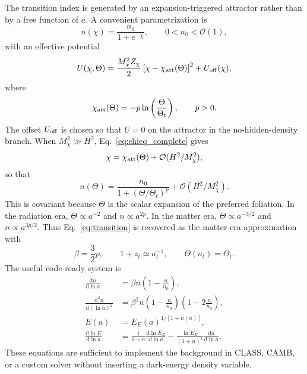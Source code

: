 \documentclass[aps,prd,reprint,nofootinbib,superscriptaddress,longbibliography]{revtex4-2}
\newcommand{\dd}{\mathrm{d}}
\begin{document}
The transition index is generated by an expansion-triggered attractor rather than by a free function of $a$.  A convenient parametrization is
\begin{equation}
  n(\chi)=\frac{n_0}{1+e^{-\chi}},
  \qquad
  0<n_0<\mathcal O(1),
  \label{eq:nchi_logistic}
\end{equation}
with an effective potential
\begin{equation}
  U(\chi,\Theta)=\frac{M_\chi^2Z_\chi}{2}\left[\chi-\chi_{\rm att}(\Theta)\right]^2
  +U_{\rm off}(\chi),
  \label{eq:U_chi_theta}
\end{equation}
where
\begin{equation}
  \chi_{\rm att}(\Theta)=-p\ln\left(\frac{\Theta}{\Theta_t}\right),
  \qquad
  p>0.
  \label{eq:chi_attractor}
\end{equation}
The offset $U_{\rm off}$ is chosen so that $U=0$ on the attractor in the no-hidden-density branch.  When $M_\chi^2\gg H^2$, Eq.~\eqref{eq:chieq_complete} gives
\begin{equation}
  \chi=\chi_{\rm att}(\Theta)+\mathcal O(H^2/M_\chi^2),
  \label{eq:chi_tracks}
\end{equation}
so that
\begin{equation}
  n(\Theta)=\frac{n_0}{1+(\Theta/\Theta_t)^p}+
  \mathcal O(H^2/M_\chi^2).
  \label{eq:n_theta_transition}
\end{equation}
This is covariant because $\Theta$ is the scalar expansion of the preferred foliation.  In the radiation era, $\Theta\propto a^{-2}$ and $n\propto a^{2p}$.  In the matter era, $\Theta\propto a^{-3/2}$ and $n\propto a^{3p/2}$.  Thus Eq.~\eqref{eq:transition} is recovered as the matter-era approximation with
\begin{equation}
  \beta=\frac32p,
  \qquad
  1+z_t\simeq a_t^{-1},
  \qquad
  \Theta(a_t)=\Theta_t .
  \label{eq:beta_p_relation}
\end{equation}
The useful code-ready system is
\begin{align}
  \frac{\dd n}{\dd\ln a}&=\beta n\left(1-\frac{n}{n_0}\right),\label{eq:nprime_code}\\
  \frac{\dd^2 n}{\dd(\ln a)^2}&=\beta^2 n\left(1-\frac{n}{n_0}\right)\left(1-2\frac{n}{n_0}\right),\label{eq:nsecond_code}\\
  E(a)&=E_E(a)^{1/[1+n(a)]},\label{eq:E_code}\\
  \frac{\dd\ln E}{\dd\ln a}&=\frac{1}{1+n}\frac{\dd\ln E_E}{\dd\ln a}
  -\frac{\ln E_E}{(1+n)^2}\frac{\dd n}{\dd\ln a} .\label{eq:Eprime_code}
\end{align}
These equations are sufficient to implement the background in CLASS, CAMB, or a custom solver without inserting a dark-energy density variable.
\end{document}
